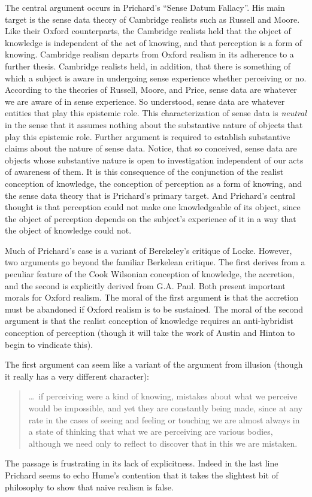 \documentclass[11pt]{article}
\begin{document}
The central argument occurs in Prichard's \citeyearpar{Prichard:1938ve} ``Sense Datum Fallacy''. His main target is the sense data theory of Cambridge realists such as Russell and Moore. Like their Oxford counterparts, the Cambridge realists held that the object of knowledge is independent of the act of knowing, and that perception is a form of knowing. Cambridge realism departs from Oxford realism in its adherence to a further thesis. Cambridge realists held, in addition, that there is something of which a subject is aware in undergoing sense experience whether perceiving or no. According to the theories of Russell, Moore, and Price, sense data are whatever we are aware of in sense experience. So understood, sense data are whatever entities that play this epistemic role. This characterization of sense data is \emph{neutral} in the sense that it assumes nothing about the substantive nature of objects that play this epistemic role. Further argument is required to establish substantive claims about the nature of sense data. Notice, that so conceived, sense data are objects whose substantive nature is open to investigation independent of our acts of awareness of them. It is this consequence of the conjunction of the realist conception of knowledge, the conception of perception as a form of knowing, and the sense data theory that is Prichard's primary target. And Prichard's central thought is that perception could not make one knowledgeable of its object, since the object of perception depends on the subject's experience of it in a way that the object of knowledge could not.

Much of Prichard's case is a variant of Berekeley's critique of Locke. However, two arguments go beyond the familiar Berkelean critique. The first derives from a peculiar feature of the Cook Wilsonian conception of knowledge, the accretion, and the second is explicitly derived from G.A. Paul. Both present important morals for Oxford realism. The moral of the first argument is that the accretion must be abandoned if Oxford realism is to be sustained. The moral of the second argument is that the realist conception of knowledge requires an anti-hybridist conception of perception (though it will take the work of Austin and Hinton to begin to vindicate this).

The first argument can seem like a variant of the argument from illusion (though it really has a very different character): 
\begin{quote}
	\ldots\ if perceiving were a kind of knowing, mistakes about what we perceive would be impossible, and yet they are constantly being made, since at any rate in the cases of seeing and feeling or touching we are almost always in a state of thinking that what we are perceiving are various bodies, although we need only to reflect to discover that in this we are mistaken. \citep[]{Prichard:1938ve}
\end{quote}
The passage is frustrating in its lack of explicitness. Indeed in the last line Prichard seems to echo Hume’s contention that it takes the slightest bit of philosophy to show that naïve realism is false. 
\end{document}
